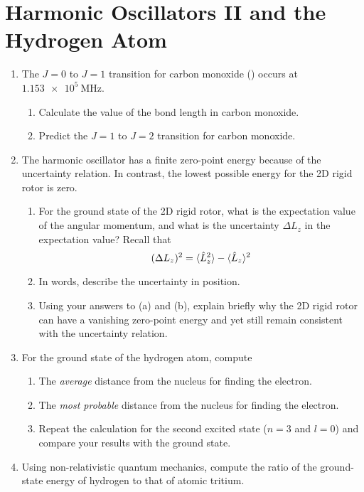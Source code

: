 \documentclass[../psets.tex]{subfiles}
\begin{document}
\section{Harmonic Oscillators II and the Hydrogen Atom}
\begin{enumerate}
    \item {}The $J=0$ to $J=1$ transition for carbon monoxide () occurs at $\SI{1.153e5}{\mega\hertz}$.
    \begin{enumerate}
        \item Calculate the value of the bond length in carbon monoxide.
        \item Predict the $J=1$ to $J=2$ transition for carbon monoxide.
    \end{enumerate}
    \item The harmonic oscillator has a finite zero-point energy because of the uncertainty relation. In contrast, the lowest possible energy for the 2D rigid rotor is zero.
    \begin{enumerate}
        \item For the ground state of the 2D rigid rotor, what is the expectation value of the angular momentum, and what is the uncertainty $\Delta L_z$ in the expectation value? Recall that
        \begin{equation*}
            (\Delta L_z)^2 = \langle{\hat{L}_z^2}\rangle-\langle{\hat{L}_z}\rangle^2
        \end{equation*}
        \item In words, describe the uncertainty in position.
        \item Using your answers to (a) and (b), explain briefly why the 2D rigid rotor can have a vanishing zero-point energy and yet still remain consistent with the uncertainty relation.
    \end{enumerate}
    \item For the ground state of the hydrogen atom, compute
    \begin{enumerate}
        \item The \emph{average} distance from the nucleus for finding the electron.
        \item The \emph{most probable} distance from the nucleus for finding the electron.
        \item Repeat the calculation for the second excited state ($n=3$ and $l=0$) and compare your results with the ground state.
    \end{enumerate}
    \item Using non-relativistic quantum mechanics, compute the ratio of the ground-state energy of hydrogen to that of atomic tritium.

\end{enumerate}
\end{document}
